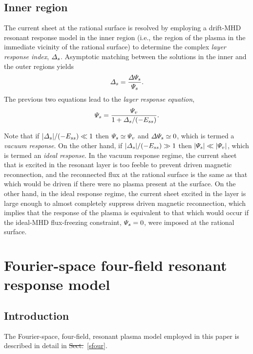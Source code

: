\documentclass[12pt,prb,aps]{revtex4-1}
\providecommand{\DIFadd}[1]{{\protect\color{blue}\uwave{#1}}} %
\providecommand{\DIFdel}[1]{{\protect\color{red}\sout{#1}}}                      %
\providecommand{\DIFaddbegin}{} %
\providecommand{\DIFaddend}{} %
\providecommand{\DIFdelbegin}{} %
\providecommand{\DIFdelend}{} %
\begin{document}
\subsection{Inner region}
The current sheet at the rational surface is resolved by employing a drift-MHD resonant response model
in the  inner region (i.e., the region of the plasma in the immediate vicinity of the rational surface) to determine the
complex {\em layer response index}, ${\mit\Delta}_s$. Asymptotic matching between the solutions in the inner and the outer regions
yields\DIFaddbegin \DIFadd{, 
}\DIFaddend \begin{equation}\label{e4g}
{\mit\Delta}_s= \frac{{\mit\Delta\Psi}_{\!s}}{{\mit\Psi}_s}.
\end{equation}
The previous two equations lead to the {\em layer response equation}, 
\begin{equation}\label{response}
{\mit\Psi}_s = \frac{{\mit\Psi}_v}{1+{\mit\Delta}_s/(-E_{ss})}.
\end{equation}

Note that if $|{\mit\Delta}_s|/(-E_{ss})\ll 1$ then ${\mit\Psi}_s\simeq {\mit\Psi}_v$ and ${\mit\Delta\Psi}_{\!s}\simeq 0$, 
which is termed a {\em vacuum response}. On the other hand, if $|{\mit\Delta}_s|/(-E_{ss})\gg 1$ then $|{\mit\Psi}_s|\ll |{\mit\Psi}_v|$,
which is termed an {\em ideal response}. In the vacuum response regime, the current sheet that is excited in the resonant layer is too feeble
to prevent driven magnetic reconnection, and the reconnected flux at the rational surface is the same as that which would
be driven if there were no plasma present at the surface. On the other hand, in the ideal response regime, the  current sheet excited in the layer is
large enough to almost completely suppress driven magnetic reconnection, which implies that the response of the plasma is equivalent
to that which would occur if the ideal-MHD flux-freezing constraint, ${\mit\Psi}_s=0$, were imposed at the rational surface.\cite{rf2025}

\section{Fourier-space four-field resonant response model}\label{sect3}
\subsection{Introduction}
The Fourier-space,  four-field, resonant plasma model employed in this paper is described in detail in \DIFdelbegin \DIFdel{Sect.}\DIFdelend \DIFaddbegin \DIFadd{Appendix}\DIFaddend ~\ref{sfour}. 
\end{document}
